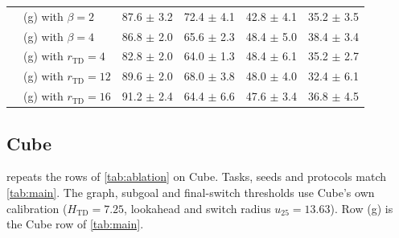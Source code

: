\documentclass{article} %
\newcommand{\Htd}{r_{\mathrm{TD}}}
\theoremstyle{definition}
\theoremstyle{remark}
\begin{document}
\begin{table}[h]
\begin{tabular}{@{}l>{\raggedright\arraybackslash}p{4.3cm}rrrr@{}}
& (g) with $\beta=2$ & 87.6 $\pm$ 3.2 & 72.4 $\pm$ 4.1 & 42.8 $\pm$ 4.1 & 35.2 $\pm$ 3.5 \\
& (g) with $\beta=4$ & 86.8 $\pm$ 2.0 & 65.6 $\pm$ 2.3 & 48.4 $\pm$ 5.0 & 38.4 $\pm$ 3.4 \\
\midrule
& (g) with $\Htd=4$ & 82.8 $\pm$ 2.0 & 64.0 $\pm$ 1.3 & 48.4 $\pm$ 6.1 & 35.2 $\pm$ 2.7 \\
& (g) with $\Htd=12$ & 89.6 $\pm$ 2.0 & 68.0 $\pm$ 3.8 & 48.0 $\pm$ 4.0 & 32.4 $\pm$ 6.1 \\
& (g) with $\Htd=16$ & 91.2 $\pm$ 2.4 & 64.4 $\pm$ 6.6 & 47.6 $\pm$ 3.4 & 36.8 $\pm$ 4.5 \\
\bottomrule
\end{tabular}
\end{table}

\subsection{Cube}
\label{app:ablation-cube}
 repeats the rows of \cref{tab:ablation} on Cube. Tasks, seeds and
protocols match \cref{tab:main}. The graph, subgoal and final-switch thresholds use Cube's own
calibration ($H_{\mathrm{TD}}=7.25$, lookahead and switch radius $u_{25}=13.63$). Row (g) is the Cube row of \cref{tab:main}.
\end{document}
